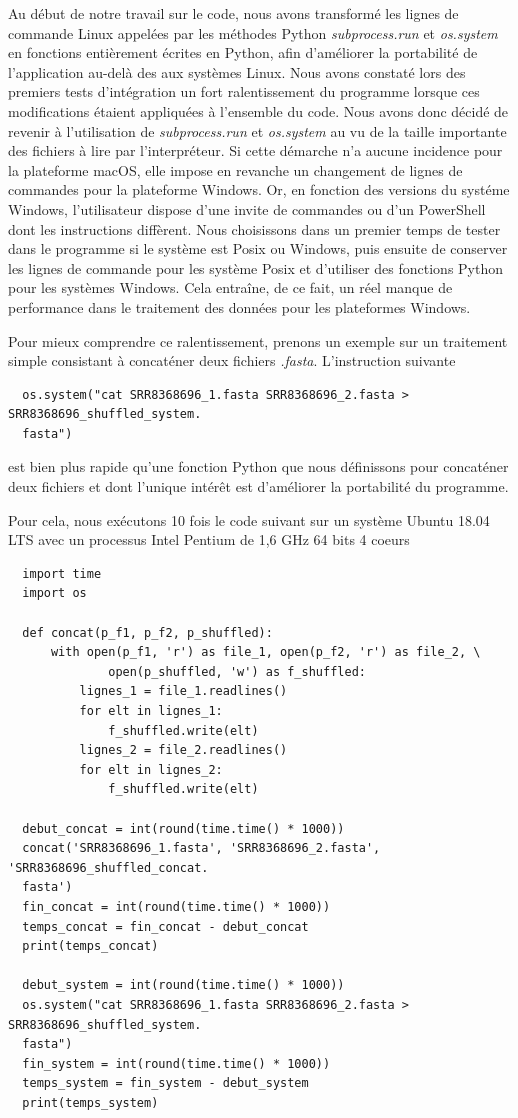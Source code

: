 \documentclass[twoside,a4paper,11pt,frenchb,openany]{report}
\begin{document}
Au début de notre travail sur le code, nous avons transformé les lignes de commande Linux appelées par les méthodes Python \textit{subprocess.run} et \textit{os.system} en fonctions entièrement écrites en Python, afin d'améliorer la portabilité de l'application au-delà des aux systèmes Linux. Nous avons constaté lors des premiers tests d'intégration un fort ralentissement du programme lorsque ces modifications étaient appliquées à l'ensemble du code. Nous avons donc décidé de revenir à l'utilisation de \textit{subprocess.run} et \textit{os.system} au vu de la taille importante des fichiers à lire par l'interpréteur. Si cette démarche n'a aucune incidence pour la plateforme macOS, elle impose en revanche un changement de lignes de commandes pour la plateforme Windows. Or, en fonction des versions du systéme Windows, l'utilisateur dispose d'une invite de commandes ou d'un PowerShell dont les instructions diffèrent. Nous choisissons dans un premier temps de tester dans le programme si le système est Posix ou Windows, puis ensuite de conserver les lignes de commande pour les système Posix et d'utiliser des fonctions Python pour les systèmes Windows. Cela entraîne, de ce fait, un réel manque de performance dans le traitement des données pour les plateformes Windows. 

Pour mieux comprendre ce ralentissement, prenons un exemple sur un traitement simple consistant à concaténer deux fichiers \textit{.fasta}. L'instruction suivante

\begin{verbatim}  os.system("cat SRR8368696_1.fasta SRR8368696_2.fasta > SRR8368696_shuffled_system.
  fasta")\end{verbatim}

est bien plus rapide qu'une fonction Python que nous définissons pour concaténer deux fichiers et dont l'unique intérêt est d'améliorer la portabilité du programme. 

Pour cela, nous exécutons 10 fois le code suivant sur un système Ubuntu 18.04 LTS avec un processus Intel Pentium de 1,6 GHz 64 bits 4 coeurs

\begin{verbatim}
  import time
  import os

  def concat(p_f1, p_f2, p_shuffled):
      with open(p_f1, 'r') as file_1, open(p_f2, 'r') as file_2, \
              open(p_shuffled, 'w') as f_shuffled:
          lignes_1 = file_1.readlines()
          for elt in lignes_1:
              f_shuffled.write(elt)
          lignes_2 = file_2.readlines()
          for elt in lignes_2:
              f_shuffled.write(elt)

  debut_concat = int(round(time.time() * 1000))
  concat('SRR8368696_1.fasta', 'SRR8368696_2.fasta', 'SRR8368696_shuffled_concat.
  fasta')
  fin_concat = int(round(time.time() * 1000))
  temps_concat = fin_concat - debut_concat
  print(temps_concat)

  debut_system = int(round(time.time() * 1000))
  os.system("cat SRR8368696_1.fasta SRR8368696_2.fasta > SRR8368696_shuffled_system.
  fasta")
  fin_system = int(round(time.time() * 1000))
  temps_system = fin_system - debut_system
  print(temps_system)
\end{verbatim}
\end{document}
